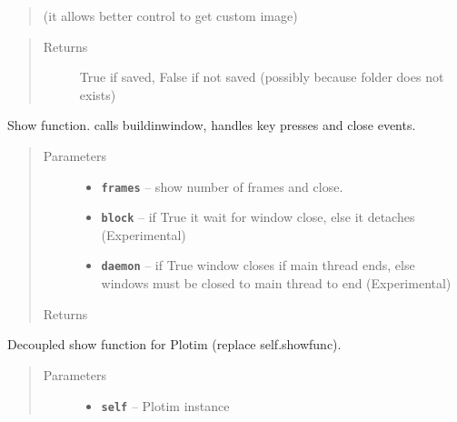 \documentclass[letterpaper,10pt,english]{sphinxmanual}
\begin{document}
\begin{fulllineitems}
\begin{fulllineitems}
\begin{quote}
(it allows better control to get custom image)
\end{quote}
\begin{quote}\begin{description}
\item[{Returns}] \leavevmode
True if saved, False if not saved (possibly because folder does not exists)

\end{description}\end{quote}

\end{fulllineitems}


\begin{fulllineitems}
\label{RRtoolbox.lib:RRtoolbox.lib.plotter.Plotim.show}
Show function. calls buildinwindow, handles key presses and close events.
\begin{quote}\begin{description}
\item[{Parameters}] \leavevmode\begin{itemize}
\item {} 
\textbf{\texttt{frames}} -- show number of frames and close.

\item {} 
\textbf{\texttt{block}} -- if True it wait for window close, else it detaches (Experimental)

\item {} 
\textbf{\texttt{daemon}} -- if True window closes if main thread ends,
else windows must be closed to main thread to end (Experimental)

\end{itemize}

\item[{Returns}] \leavevmode


\end{description}\end{quote}

\end{fulllineitems}


\begin{fulllineitems}
\label{RRtoolbox.lib:RRtoolbox.lib.plotter.Plotim.showfunc}
Decoupled show function for Plotim (replace self.showfunc).
\begin{quote}\begin{description}
\item[{Parameters}] \leavevmode\begin{itemize}
\item {} 
\textbf{\texttt{self}} -- Plotim instance


\end{itemize}
\end{description}
\end{quote}
\end{fulllineitems}
\end{fulllineitems}
\end{document}

